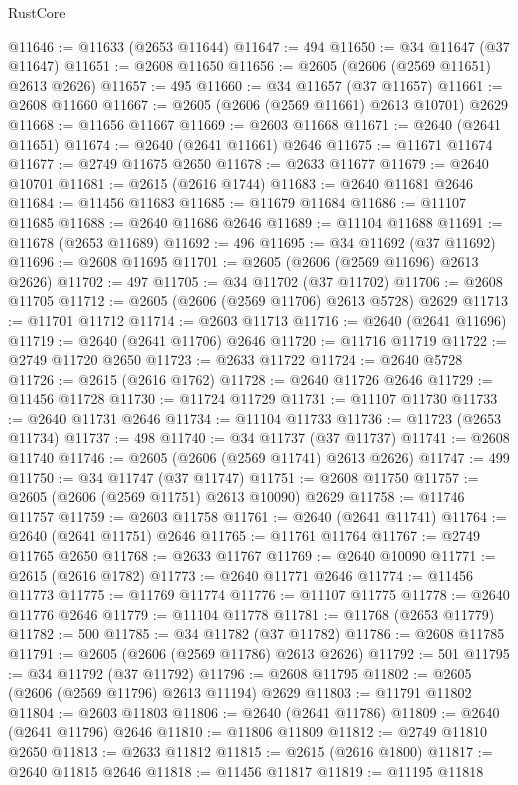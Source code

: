 \begin{lexlean}{RustCore}
\begin{coremodule}
@11646 := @11633 (@2653 @11644)
@11647 := 494
@11650 := @34 @11647 (@37 @11647)
@11651 := @2608 @11650
@11656 := @2605 (@2606 (@2569 @11651) @2613 @2626)
@11657 := 495
@11660 := @34 @11657 (@37 @11657)
@11661 := @2608 @11660
@11667 := @2605 (@2606 (@2569 @11661) @2613 @10701) @2629
@11668 := @11656 @11667
@11669 := @2603 @11668
@11671 := @2640 (@2641 @11651)
@11674 := @2640 (@2641 @11661) @2646
@11675 := @11671 @11674
@11677 := @2749 @11675 @2650
@11678 := @2633 @11677
@11679 := @2640 @10701
@11681 := @2615 (@2616 @1744)
@11683 := @2640 @11681 @2646
@11684 := @11456 @11683
@11685 := @11679 @11684
@11686 := @11107 @11685
@11688 := @2640 @11686 @2646
@11689 := @11104 @11688
@11691 := @11678 (@2653 @11689)
@11692 := 496
@11695 := @34 @11692 (@37 @11692)
@11696 := @2608 @11695
@11701 := @2605 (@2606 (@2569 @11696) @2613 @2626)
@11702 := 497
@11705 := @34 @11702 (@37 @11702)
@11706 := @2608 @11705
@11712 := @2605 (@2606 (@2569 @11706) @2613 @5728) @2629
@11713 := @11701 @11712
@11714 := @2603 @11713
@11716 := @2640 (@2641 @11696)
@11719 := @2640 (@2641 @11706) @2646
@11720 := @11716 @11719
@11722 := @2749 @11720 @2650
@11723 := @2633 @11722
@11724 := @2640 @5728
@11726 := @2615 (@2616 @1762)
@11728 := @2640 @11726 @2646
@11729 := @11456 @11728
@11730 := @11724 @11729
@11731 := @11107 @11730
@11733 := @2640 @11731 @2646
@11734 := @11104 @11733
@11736 := @11723 (@2653 @11734)
@11737 := 498
@11740 := @34 @11737 (@37 @11737)
@11741 := @2608 @11740
@11746 := @2605 (@2606 (@2569 @11741) @2613 @2626)
@11747 := 499
@11750 := @34 @11747 (@37 @11747)
@11751 := @2608 @11750
@11757 := @2605 (@2606 (@2569 @11751) @2613 @10090) @2629
@11758 := @11746 @11757
@11759 := @2603 @11758
@11761 := @2640 (@2641 @11741)
@11764 := @2640 (@2641 @11751) @2646
@11765 := @11761 @11764
@11767 := @2749 @11765 @2650
@11768 := @2633 @11767
@11769 := @2640 @10090
@11771 := @2615 (@2616 @1782)
@11773 := @2640 @11771 @2646
@11774 := @11456 @11773
@11775 := @11769 @11774
@11776 := @11107 @11775
@11778 := @2640 @11776 @2646
@11779 := @11104 @11778
@11781 := @11768 (@2653 @11779)
@11782 := 500
@11785 := @34 @11782 (@37 @11782)
@11786 := @2608 @11785
@11791 := @2605 (@2606 (@2569 @11786) @2613 @2626)
@11792 := 501
@11795 := @34 @11792 (@37 @11792)
@11796 := @2608 @11795
@11802 := @2605 (@2606 (@2569 @11796) @2613 @11194) @2629
@11803 := @11791 @11802
@11804 := @2603 @11803
@11806 := @2640 (@2641 @11786)
@11809 := @2640 (@2641 @11796) @2646
@11810 := @11806 @11809
@11812 := @2749 @11810 @2650
@11813 := @2633 @11812
@11815 := @2615 (@2616 @1800)
@11817 := @2640 @11815 @2646
@11818 := @11456 @11817
@11819 := @11195 @11818

\end{coremodule}
\end{lexlean}
